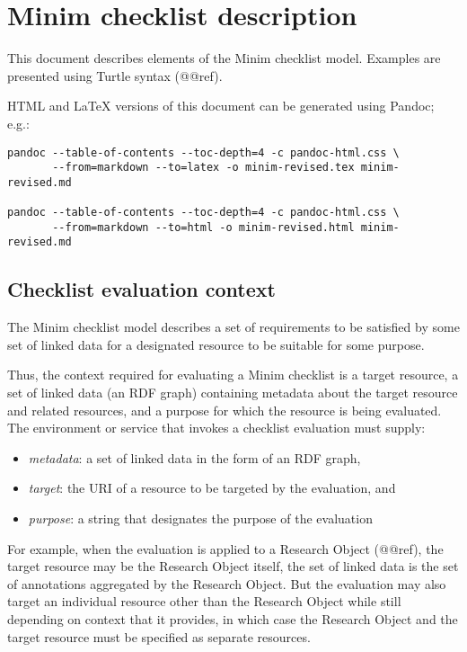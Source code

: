 \documentclass[]{article}
\author{}
\date{}
\begin{document}
{
\hypersetup{linkcolor=black}
\setcounter{tocdepth}{4}
\tableofcontents
}
\section{Minim checklist description}

This document describes elements of the Minim checklist model. Examples
are presented using Turtle syntax (@@ref).

HTML and LaTeX versions of this document can be generated using Pandoc;
e.g.:

\begin{verbatim}
pandoc --table-of-contents --toc-depth=4 -c pandoc-html.css \
       --from=markdown --to=latex -o minim-revised.tex minim-revised.md

pandoc --table-of-contents --toc-depth=4 -c pandoc-html.css \
       --from=markdown --to=html -o minim-revised.html minim-revised.md
\end{verbatim}

\subsection{Checklist evaluation context}

The Minim checklist model describes a set of requirements to be
satisfied by some set of linked data for a designated resource to be
suitable for some purpose.

Thus, the context required for evaluating a Minim checklist is a target
resource, a set of linked data (an RDF graph) containing metadata about
the target resource and related resources, and a purpose for which the
resource is being evaluated. The environment or service that invokes a
checklist evaluation must supply:

\begin{itemize}
\itemsep1pt\parskip0pt
\item
  \emph{metadata}: a set of linked data in the form of an RDF graph,
\item
  \emph{target}: the URI of a resource to be targeted by the evaluation,
  and
\item
  \emph{purpose}: a string that designates the purpose of the evaluation
\end{itemize}

For example, when the evaluation is applied to a Research Object
(@@ref), the target resource may be the Research Object itself, the set
of linked data is the set of annotations aggregated by the Research
Object. But the evaluation may also target an individual resource other
than the Research Object while still depending on context that it
provides, in which case the Research Object and the target resource must
be specified as separate resources.
\end{document}

